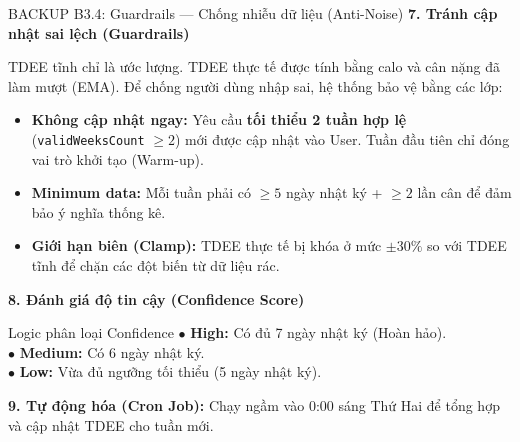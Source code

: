 \documentclass[10pt, aspectratio=169]{beamer}
\begin{document}
\begin{frame}[fragile, label=b3_4]{BACKUP B3.4: Guardrails — Chống nhiễu dữ liệu (Anti-Noise)}
\hypertarget{b3_4_target}{}
    \textbf{7. Tránh cập nhật sai lệch (Guardrails)}
    
    TDEE tĩnh chỉ là ước lượng. TDEE thực tế được tính bằng calo và cân nặng đã làm mượt (EMA). Để chống người dùng nhập sai, hệ thống bảo vệ bằng các lớp:
    
    \begin{itemize}
        \scriptsize
        \item \textbf{Không cập nhật ngay:} Yêu cầu \textbf{tối thiểu 2 tuần hợp lệ} (\texttt{validWeeksCount} $\ge 2$) mới được cập nhật vào User. Tuần đầu tiên chỉ đóng vai trò khởi tạo (Warm-up).
        \item \textbf{Minimum data:} Mỗi tuần phải có $\ge 5$ ngày nhật ký + $\ge 2$ lần cân để đảm bảo ý nghĩa thống kê.
        \item \textbf{Giới hạn biên (Clamp):} TDEE thực tế bị khóa ở mức $\pm 30\%$ so với TDEE tĩnh để chặn các đột biến từ dữ liệu rác.
    \end{itemize}
    
    \vspace{0.1cm}
    \textbf{8. Đánh giá độ tin cậy (Confidence Score)}
    \begin{block}{\scriptsize Logic phân loại Confidence}
        \scriptsize
        $\bullet$ \textbf{High:} Có đủ 7 ngày nhật ký (Hoàn hảo).\\
        $\bullet$ \textbf{Medium:} Có 6 ngày nhật ký.\\
        $\bullet$ \textbf{Low:} Vừa đủ ngưỡng tối thiểu (5 ngày nhật ký).
    \end{block}
    
    \vspace{0.1cm}
    \textbf{9. Tự động hóa (Cron Job):} Chạy ngầm vào 0:00 sáng Thứ Hai để tổng hợp và cập nhật TDEE cho tuần mới.
\end{frame}
\end{document}
